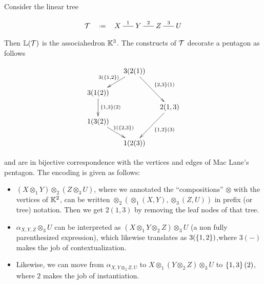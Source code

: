 \begin{example}
Consider the linear tree
\vspace{-.7cm}
\begin{center}
$$\xymatrix @-1.65pc {{\cal T} & \eqdef  &X \ar @{-}[rr]^{1}&& Y \ar @{-}[rr]^{2}&& Z \ar @{-}[rr]^{3}&& U}
  $$
\end{center}
Then ${\mathbb L}({\cal T})$ is the associahedron ${\mathbb K}^3$. 
The constructs of ${\cal T}$ decorate a pentagon as follows

\begin{center}
$$\xymatrix @-1.65pc {&& 3(2(1)) \ar @{->}[ddll]_{3(\set{1,2})} \ar @{->}[dddrr]^{\set{2,3}(1)}&& \\
 &&&&\\
3(1(2))   \ar @{->}[dd]^{\set{1,3}(2)}&&   && \\
 &&&&2(1,3) \ar @{->}[dddll]^{\set{1,2}(3)}\\
 1(3(2)) \ar @{->}[ddrr]^{1(\set{2,3})} &  &\\
 &&&&\\
 &&1(2(3))&&}$$
\end{center}
and are in bijective correspondence with the vertices and edges of Mac Lane's pentagon. 
The encoding is given as follows:
  \begin{itemize}
  \item $(X\otimes_1 Y)\otimes_2 (Z\otimes_3 U)$, where we annotated the ``compositions'' $\otimes$ with the vertices of ${\mathbb K}^2$, can be written $\otimes_2(\otimes_1(X,Y),\otimes_3(Z,U))$ in prefix (or tree) notation. Then we get 
 $2(1,3)$ by removing the leaf nodes of that tree.
 \item $\alpha_{X,Y,Z}\otimes_3 U$ can be interpreted as $(X\otimes_1 Y\otimes_2 Z)\otimes_3 U$ (a non fully parenthesized expression), which likewise 
 translates as $3(\left\{1,2\right\})$,where $3(-)$ makes the job of contextualization.
 \item Likewise, we can move from
$\alpha_{X,Y\otimes_2 Z,U}$ to $X\otimes_1(Y\otimes_2 Z)\otimes_3 U$ to $\left\{1,3\right\}(2)$, where $2$ makes the job of instantiation.
\end{itemize}
\end{example}

